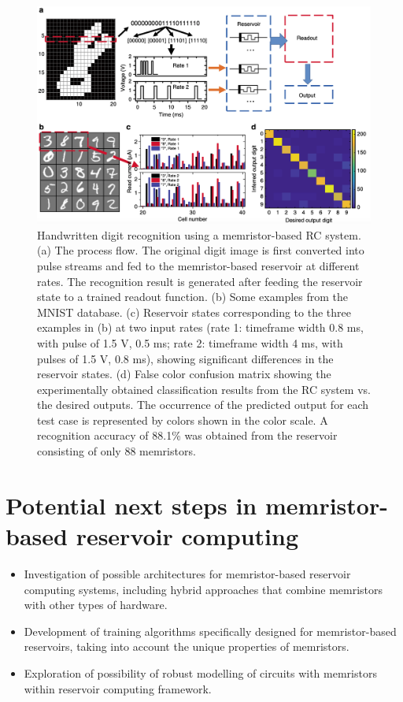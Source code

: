 \documentclass[11pt, oneside]{article}
\begin{document}
\begin{figure}[H]
    \centering
    \includegraphics[width=\textwidth]{figs/reservoir-memristor-4.png}

    \caption{Handwritten digit recognition using a memristor-based RC system. (a) The process flow. The original digit image is first converted into pulse streams and fed to the memristor-based reservoir at different rates. The recognition result is generated after feeding the reservoir state to a trained readout function. (b) Some examples from the MNIST database. (c) Reservoir states corresponding to the three examples in (b) at two input rates (rate 1: timeframe width 0.8 ms, with pulse of 1.5 V, 0.5 ms; rate 2: timeframe width 4 ms, with pulses of 1.5 V, 0.8 ms), showing significant differences in the reservoir states. (d) False color confusion matrix showing the experimentally obtained classification results from the RC system vs. the desired outputs. The occurrence of the predicted output for each test case is represented by colors shown in the color scale. A recognition accuracy of 88.1\% was obtained from the reservoir consisting of only 88 memristors.}
\end{figure}
\section{Potential next steps in memristor-based reservoir computing}

\begin{itemize}
    \item Investigation of possible architectures for memristor-based reservoir computing systems, including hybrid approaches that combine memristors with other types of hardware.
    \item Development of training algorithms specifically designed for memristor-based reservoirs, taking into account the unique properties of memristors.
    \item Exploration of possibility of robust modelling of circuits with memristors within reservoir computing framework.
\end{itemize}
\end{document}
